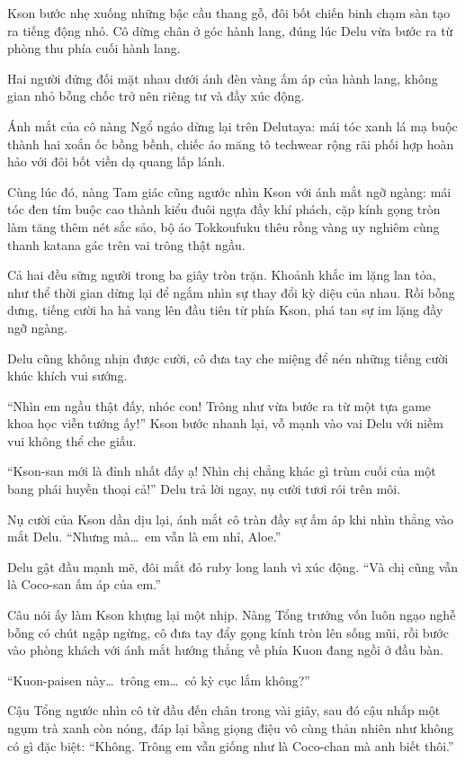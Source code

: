 ﻿\documentclass[../main.tex]{subfiles}
\begin{document}
Kson bước nhẹ xuống những bậc cầu thang gỗ, đôi bốt chiến binh chạm sàn tạo ra tiếng động nhỏ. Cô dừng chân ở góc hành lang, đúng lúc Delu vừa bước ra từ phòng thu phía cuối hành lang.

Hai người đứng đối mặt nhau dưới ánh đèn vàng ấm áp của hành lang, không gian nhỏ bỗng chốc trở nên riêng tư và đầy xúc động.

Ánh mắt của cô nàng Ngổ ngáo dừng lại trên Delutaya: mái tóc xanh lá mạ buộc thành hai xoắn ốc bồng bềnh, chiếc áo măng tô techwear rộng rãi phối hợp hoàn hảo với đôi bốt viền dạ quang lấp lánh.

Cùng lúc đó, nàng Tam giác cũng ngước nhìn Kson với ánh mắt ngỡ ngàng: mái tóc đen tím buộc cao thành kiểu đuôi ngựa đầy khí phách, cặp kính gọng tròn làm tăng thêm nét sắc sảo, bộ áo Tokkoufuku thêu rồng vàng uy nghiêm cùng thanh katana gác trên vai trông thật ngầu.

Cả hai đều sững người trong ba giây tròn trặn. Khoảnh khắc im lặng lan tỏa, như thể thời gian dừng lại để ngắm nhìn sự thay đổi kỳ diệu của nhau. Rồi bỗng dưng, tiếng cười ha hả vang lên đầu tiên từ phía Kson, phá tan sự im lặng đầy ngỡ ngàng.

Delu cũng không nhịn được cười, cô đưa tay che miệng để nén những tiếng cười khúc khích vui sướng.

``Nhìn em ngầu thật đấy, nhóc con! Trông như vừa bước ra từ một tựa game khoa học viễn tưởng ấy!'' Kson bước nhanh lại, vỗ mạnh vào vai Delu với niềm vui không thể che giấu.

``Kson-san mới là đỉnh nhất đấy ạ! Nhìn chị chẳng khác gì trùm cuối của một bang phái huyền thoại cả!'' Delu trả lời ngay, nụ cười tươi rói trên môi.

Nụ cười của Kson dần dịu lại, ánh mắt cô tràn đầy sự ấm áp khi nhìn thẳng vào mắt Delu. ``Nhưng mà\dots\ em vẫn là em nhỉ, Aloe.''

Delu gật đầu mạnh mẽ, đôi mắt đỏ ruby long lanh vì xúc động. ``Và chị cũng vẫn là Coco-san ấm áp của em.''

Câu nói ấy làm Kson khựng lại một nhịp. Nàng Tổng trưởng vốn luôn ngạo nghễ bỗng có chút ngập ngừng, cô đưa tay đẩy gọng kính tròn lên sống mũi, rồi bước vào phòng khách với ánh mắt hướng thẳng về phía Kuon đang ngồi ở đầu bàn.

``Kuon-paisen này\dots\ trông em\dots\ có kỳ cục lắm không?''

Cậu Tổng ngước nhìn cô từ đầu đến chân trong vài giây, sau đó cậu nhấp một ngụm trà xanh còn nóng, đáp lại bằng giọng điệu vô cùng thản nhiên như không có gì đặc biệt: ``Không. Trông em vẫn giống như là Coco-chan mà anh biết thôi.''
\end{document}
